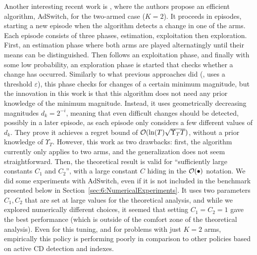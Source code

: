 Another interesting recent work is \cite{AuerGajaneOrtner18}, where the authors propose an efficient algorithm, AdSwitch, for the two-armed case ($K=2$).
It proceeds in episodes, starting a new episode when the algorithm detects a change in one of the arms.
Each episode consists of three phases, estimation, exploitation then exploration.
First, an estimation phase where both arms are played alternatingly until their means can be distinguished.
Then follows an exploitation phase, and finally with some low probability, an exploration phase is started that checks whether a change has occurred.
Similarly to what previous approaches did (\eg, \CUSUM{} uses a threshold $\varepsilon$), this phase checks for changes of a certain minimum magnitude, but the innovation in this work is that this algorithm does not need any prior knowledge of the minimum magnitude.
Instead, it uses geometrically decreasing magnitudes $d_k = 2^{-i}$, meaning that even difficult changes should be detected, possibly in a later episode, as each episode only considers a few different values of $d_k$.
They prove it achieves a regret bound of $\mathcal{O}(\ln(T) \sqrt{\Upsilon_T T})$, without a prior knowledge of $\Upsilon_T$.
However, this work as two drawbacks:
first, the algorithm currently only applies to two arms, and the generalization does not seem straightforward.
Then, the theoretical result is valid for ``sufficiently large constants $C_1$ and $C_2$'', with a large constant $C$ hiding in the $\mathcal{O}(\bullet)$ notation.
We did some experiments with AdSwitch, even if it is not included in the benchmark presented below in Section~\ref{sec:6:NumericalExperiments}. It uses two parameters $C_1,C_2$ that are set at large values for the theoretical analysis,
and while we explored numerically different choices, it seemed that setting $C_1=C_2=1$ gave the best performance (which is outside of the comfort zone of the theoretical analysis). Even for this tuning, and for problems with just $K=2$ arms, empirically   this policy is performing poorly in comparison to other policies based on active CD detection and \klUCB{} indexes.


